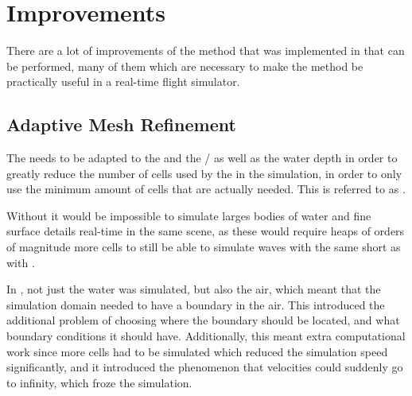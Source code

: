 \chapter{Improvements}
\label{chap:improvements}

There are a lot of improvements of the method that was implemented in \thisprojectwork that can be performed, many of them which are necessary  to make the method be practically useful in a real-time flight simulator.



\section{Adaptive Mesh Refinement}

The \LOD needs to be adapted to the  and the \FOV/ as well as the water depth in order to greatly reduce the number of cells used by the \FVM in the simulation, in order to only use the minimum amount of cells that are actually needed. This is referred to as \AMR.

Without \AMR it would be impossible to simulate larges bodies of water and fine surface details real-time in the same scene, as these would require heaps of orders of magnitude more cells to still be able to simulate waves with the same short \wavelength as with \AMR.


In \thisprojectwork, not just the water was simulated, but also the air, which meant that the simulation domain needed to have a boundary in the air. This introduced the additional problem of choosing where the boundary should be located, and what boundary conditions it should have. Additionally, this meant extra computational work since more cells had to be simulated which reduced the simulation speed significantly, and it introduced the phenomenon that velocities could suddenly go to infinity, which froze the simulation.

